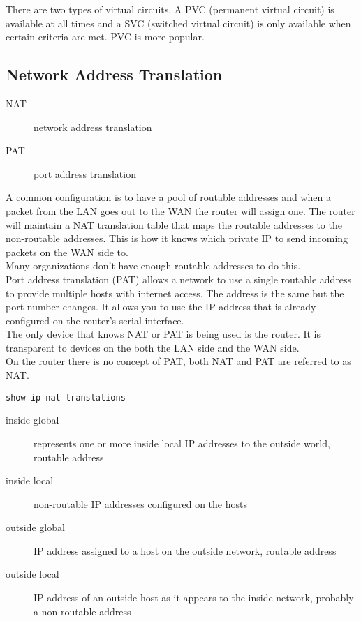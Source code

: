 There are two types of virtual circuits. A PVC (permanent virtual circuit)
is available at all times and a SVC (switched virtual circuit) is only
available when certain criteria are met. PVC is more popular.

\subsection{Network Address Translation}

\begin{description}

\item[NAT]
network address translation  

\item[PAT]
port address translation

\end{description}

A common configuration is to have a pool of routable addresses and when a
packet from the LAN goes out to the WAN the router will assign one. The
router will maintain a NAT translation table that maps the routable addresses
to the non-routable addresses. This is how it knows which private IP to
send incoming packets on the WAN side to.\\

Many organizations don't have enough routable addresses to do this.\\

Port address translation (PAT) allows a network to use a single routable
address to provide multiple hosts with internet access. The address is the
same but the port number changes. It allows you to use the IP address that is
already configured on the router's serial interface.\\

The only device that knows NAT or PAT is being used is the router. It
is transparent to devices on the both the LAN side and the WAN side.\\

On the router there is no concept of PAT, both NAT and PAT are referred to
as NAT.

\begin{verbatim}
show ip nat translations
\end{verbatim}

\begin{description}

\item[inside global]
represents one or more inside local IP addresses to the outside world, routable
address

\item[inside local]
non-routable IP addresses configured on the hosts

\item[outside global]
IP address assigned to a host on the outside network, routable address

\item[outside local]
IP address of an outside host as it appears to the inside network, probably
a non-routable address

\end{description}

